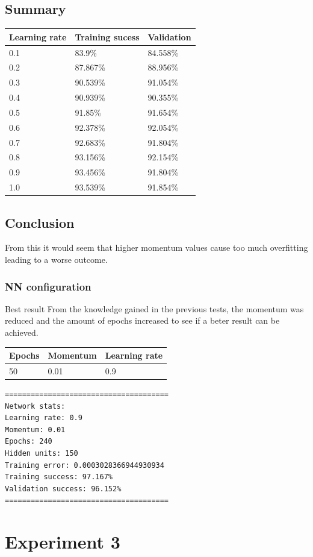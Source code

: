 \documentclass[11pt]{article}
\begin{document}
\hypertarget{summary}{%
\subsection{Summary}\label{summary}}

\begin{longtable}[]{@{}lll@{}}
\toprule
Learning rate & Training sucess & Validation\tabularnewline
\midrule
\endhead
0.1 & 83.9\% & 84.558\%\tabularnewline
0.2 & 87.867\% & 88.956\%\tabularnewline
0.3 & 90.539\% & 91.054\%\tabularnewline
0.4 & 90.939\% & 90.355\%\tabularnewline
0.5 & 91.85\% & 91.654\%\tabularnewline
0.6 & 92.378\% & 92.054\%\tabularnewline
0.7 & 92.683\% & 91.804\%\tabularnewline
0.8 & 93.156\% & 92.154\%\tabularnewline
0.9 & 93.456\% & 91.804\%\tabularnewline
1.0 & 93.539\% & 91.854\%\tabularnewline
\bottomrule
\end{longtable}

    \hypertarget{conclusion}{%
\subsection{Conclusion}\label{conclusion}}

From this it would seem that higher momentum values cause too much
overfitting leading to a worse outcome.

\hypertarget{nn-configuration}{%
\subsubsection{NN configuration}\label{nn-configuration}}

Best result From the knowledge gained in the previous tests, the
momentum was reduced and the amount of epochs increased to see if a
beter result can be achieved.

\begin{longtable}[]{@{}lll@{}}
\toprule
Epochs & Momentum & Learning rate\tabularnewline
\midrule
\endhead
50 & 0.01 & 0.9\tabularnewline
\bottomrule
\end{longtable}

\begin{verbatim}
======================================
Network stats: 
Learning rate: 0.9
Momentum: 0.01
Epochs: 240
Hidden units: 150
Training error: 0.0003028366944930934
Training success: 97.167%
Validation success: 96.152%
======================================
\end{verbatim}

    \hypertarget{experiment-3}{%
\section{Experiment 3}\label{experiment-3}}
\end{document}
